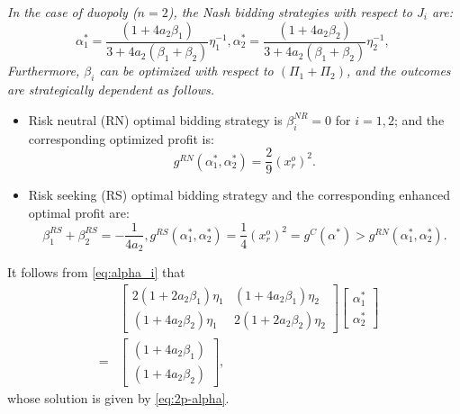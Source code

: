 \documentclass[conference]{IEEEtran}
\begin{document}
 {\it In the case of duopoly ($n=2$), the Nash bidding strategies with respect to $J_i$ are:
\begin{subequations}
\label{eq:2p-alpha}
\begin{equation}
\alpha_1^*= \frac{(1+4a_2\beta_1)}{3+4a_2(\beta_1+\beta_2)}\eta_1^{-1}, 
\label{eq:2p-alpha1}
\end{equation} 
\begin{equation}
 \alpha_2^*= \frac{(1+4a_2\beta_2)}{3+4a_2(\beta_1+\beta_2)}\eta_2^{-1}, \, 
\label{eq:2p-alpha2}
\end{equation} 
\end{subequations}
Furthermore, $\beta_i$ can be optimized with respect to $(\Pi_1+\Pi_2)$, and the outcomes are strategically dependent as follows. 
\begin{itemize}
\item Risk neutral (RN) optimal bidding strategy is $\beta_i^{NR}=0$ for $i=1,2$; and the corresponding optimized profit is:
\begin{equation}
g^{RN}(\alpha_1^*, \alpha_2^*)  =  \frac{2}{9}(x_r^o)^2. 
\label{eq:2p-neutral}
\end{equation} 
\item Risk seeking (RS) optimal bidding strategy  and the corresponding enhanced optimal profit are:
\begin{subequations}
\label{eq:2p-RS}
\begin{equation}
\beta_1^{RS}+\beta_2^{RS}=-\frac{1}{4a_2},
\label{eq:2p-RS-beta}
\end{equation} 
\begin{equation}
g^{RS}(\alpha_1^*,\alpha_2^*) = \frac{1}{4}(x_r^o)^2 = g^C(\alpha^*)   > g^{RN}(\alpha_1^*, \alpha_2^*). 
\label{eq:2p-RS-g}
\end{equation} 
\end{subequations}
\end{itemize} }

  It follows from \eqref{eq:alpha_i} that 
 \begin{eqnarray*}
  && \begin{bmatrix} 2(1+2a_2 \beta_1)\eta_1 & (1+4a_2\beta_1)\eta_2  \\ (1+4a_2\beta_2)\eta_1  & 2(1+2a_2 \beta_2)\eta_2  \end{bmatrix}   
  \begin{bmatrix}  \alpha_1^* \\ \alpha_2^* \end{bmatrix}  \\
  & = &  \begin{bmatrix}  (1+4a_2\beta_1) \\ (1+4a_2\beta_2)\end{bmatrix},
      \end{eqnarray*}
 whose solution is given by \eqref{eq:2p-alpha}.
\end{document}
